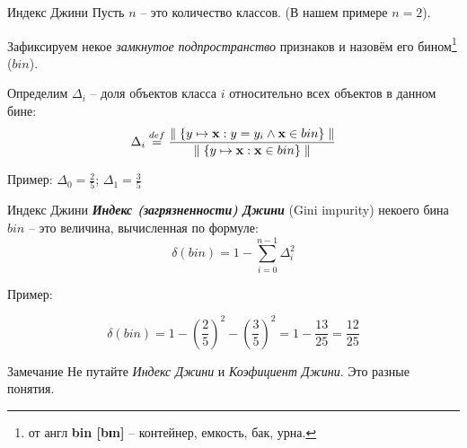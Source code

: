 \documentclass{beamer}
\newcommand{\termdef}[1]{\textbf{\textit{#1}}}
\newcommand{\term}{\textit}
\begin{document}
\begin{frame}{Индекс Джини}
  \small
  Пусть $n$ -- это количество классов. 
  (В нашем примере $n=2$).
  
  Зафиксируем некое \term{замкнутое подпространство} признаков и назовём его 
  бином\footnote{от англ \textbf{bin [bɪn]} -- контейнер, емкость, бак, урна.}
  ($bin$).
  
  Определим $\Delta_i$ -- доля объектов класса $i$ относительно всех объектов в данном бине:
  \begin{equation}
  \Delta_i \stackrel{def}{=} \frac{ \parallel \{y \mapsto \bold x : y = y_i \wedge \bold x \in bin \} \parallel}
  {
  	\parallel \{y \mapsto \bold x :  \bold x \in bin \} \parallel
  }
  \end{equation}	
 \begin{center}  
	  \begin{tikzpicture}[scale=1.5]
	  
	  \end{tikzpicture} 
	  Пример:
	    $\Delta_0 = \frac{2}{5}$; 
	  $\Delta_1 = \frac{3}{5}$
  \end{center}
	
\end{frame}

\begin{frame}{Индекс Джини}
    \small
	\termdef{Индекс (загрязненности) Джини} (Gini impurity) 
	некоего бина $bin$ -- это величина, вычисленная по формуле:
	\begin{equation}
	\delta (bin)= 1 - \sum_{i=0}^{n-1} \Delta_i ^ 2
	\end{equation}
	
	
	\begin{center}
	Пример:
		\begin{tikzpicture}[scale=1.5]
		
		\end{tikzpicture} 
	\end{center}
	
	\begin{equation*}
		\delta (bin) = 1 - \left( \frac{2}{5}\right)^2 - \left( \frac{3}{5}\right)^2 = 
		1 - \frac{13}{25} = \frac{12}{25} 
	\end{equation*}
	
	
	\begin{block}{Замечание}
		Не путайте \term{Индекс Джини} и 
		\term{Коэфициент Джини}. Это разные понятия.
	\end{block}
\end{frame}
\end{document}
